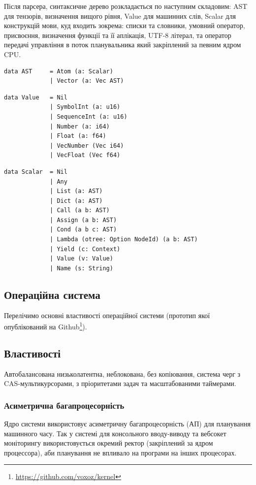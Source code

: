 Після парсера, синтаксичне дерево розкладається по наступним складовим: AST для
тензорів, визначення вищого рівня, Value для машинних слів, Scalar для
конструкцій мови, куд входить зокрема: списки та словники, умовний оператор,
присвоєння, визначення функції та її аплікація, UTF-8 літерал, та оператор
передачі управління в поток планувальника який закріплений за певним ядром CPU.

\begin{lstlisting}
data AST     = Atom (a: Scalar)
             | Vector (a: Vec AST)
\end{lstlisting}

\begin{lstlisting}
data Value   = Nil
             | SymbolInt (a: u16)
             | SequenceInt (a: u16)
             | Number (a: i64)
             | Float (a: f64)
             | VecNumber (Vec i64)
             | VecFloat (Vec f64)
\end{lstlisting}

\begin{lstlisting}
data Scalar  = Nil
             | Any
             | List (a: AST)
             | Dict (a: AST)
             | Call (a b: AST)
             | Assign (a b: AST)
             | Cond (a b c: AST)
             | Lambda (otree: Option NodeId) (a b: AST)
             | Yield (c: Context)
             | Value (v: Value)
             | Name (s: String)
\end{lstlisting}


\newpage
\subsection{Операційна система}
Перелічимо основні властивості операційної системи (прототип
якої опублікований на Github\footnote{\url{https://github.com/voxoz/kernel}}).

\subsection{Властивості}
Автобалансована низьколатентна, неблокована, без копіювання, система черг
з CAS-мультикурсорами, з пріоритетами задач та масштабованими таймерами.

\subsubsection{Асиметрична багапроцесорність}
Ядро системи використовує асиметричну багапроцесорність (АП)
для планування машинного часу. Так у системі для консольного
вводу-виводу та вебсокет моніторингу використовується окремий
ректор (закріплений за ядром процессора),
аби планування не впливало на програми на інших процесорах.
